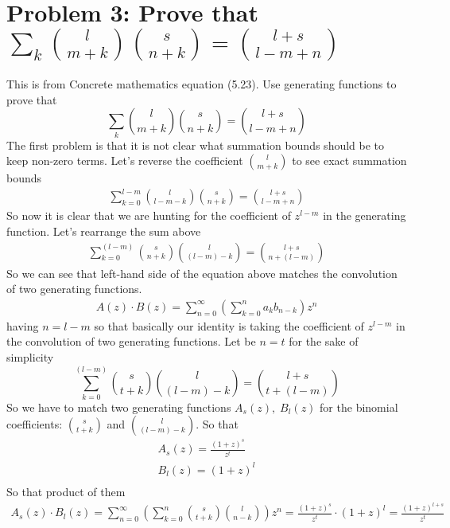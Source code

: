 ﻿\section{Problem 3: Prove that $\sum_{k} \binom{l}{m+k} \binom{s}{n+k} = \binom{l+s}{l-m+n}$}
\label{sec:problem-3:-concrete-mathematics-equation-(5.23)}
This is from Concrete mathematics equation (5.23).
Use generating functions to prove that
\begin{equation}
    \sum_{k} \binom{l}{m+k} \binom{s}{n+k} = \binom{l+s}{l-m+n}
    \label{eq:identity-to-prove-problem-3}
\end{equation}
The first problem is that it is not clear what summation bounds should be to keep non-zero terms.
Let's reverse the coefficient $\binom{l}{m+k}$ to see exact summation bounds
\begin{align*}
    \sum_{k=0}^{l-m} \binom{l}{l-m-k} \binom{s}{n+k} = \binom{l+s}{l-m+n}
\end{align*}
So now it is clear that we are hunting for the coefficient of $z^{l-m}$ in the generating function.
Let's rearrange the sum above
\begin{align*}
    \sum_{k=0}^{(l-m)} \binom{s}{n+k} \binom{l}{(l-m)-k} = \binom{l+s}{n+(l-m)}
\end{align*}
So we can see that left-hand side of the equation above matches the convolution of two generating functions.
\begin{align*}
    A(z) \cdot B(z) = \sum_{n=0}^{\infty} \left( \sum_{k=0}^{n} a_k b_{n-k} \right) z^n
\end{align*}
having $n=l-m$ so that basically our identity is taking the coefficient of $z^{l-m}$
in the convolution of two generating functions.
Let be $n=t$ for the sake of simplicity
\begin{equation}
    \sum_{k=0}^{(l-m)} \binom{s}{t+k} \binom{l}{(l-m)-k} = \binom{l+s}{t+(l-m)}
    \label{eq:identity-to-prove-problem-3-2}
\end{equation}
So we have to match two generating functions $A_s(z), \; B_l(z)$ for
the binomial coefficients: $\binom{s}{t+k}$ and $\binom{l}{(l-m)-k}$.
So that
\begin{align*}
    A_s(z) = \frac{(1+z)^s}{z^t} \\
    B_l(z) = (1+z)^l \\
\end{align*}
So that product of them
\begin{align*}
    A_s(z) \cdot B_l(z) = \sum_{n=0}^{\infty} \left( \sum_{k=0}^{n} \binom{s}{t+k} \binom{l}{n-k} \right) z^n
    = \frac{(1+z)^s}{z^t} \cdot (1+z)^l = \frac{(1+z)^{l+s}}{z^t}
\end{align*}
